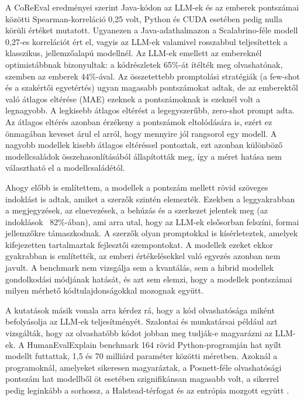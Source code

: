 \documentclass[
]{elteikthesis}[2024/04/26]
\begin{document}
A CoReEval eredményei szerint Java-kódon az LLM-ek és az emberek pontszámai
közötti Spearman-korreláció 0,25 volt, Python és CUDA esetében pedig nulla
körüli értéket mutatott. Ugyanezen a Java-adathalmazon a Scalabrino-féle modell
0,27-es korrelációt ért el, vagyis az LLM-ek valamivel rosszabbul teljesítettek
a klasszikus, jellemzőalapú modellnél. Az LLM-ek emellett az embereknél
optimistábbnak bizonyultak: a kódrészletek 65\%-át ítélték meg olvashatónak,
szemben az emberek 44\%-ával. Az összetettebb promptolási stratégiák (a few-shot
és a szakértői egyetértés) ugyan magasabb pontszámokat adtak, de az emberektől
való átlagos eltérése (MAE) ezeknek a pontszámoknak is ezeknél volt a
legnagyobb. A legkisebb átlagos eltérést a legegyszerűbb, zero-shot prompt adta.
Az átlagos eltérés azonban érzékeny a pontszámok eltolódására is, ezért ez
önmagában keveset árul el arról, hogy mennyire jól rangsorol egy modell. A
nagyobb modellek kisebb átlagos eltéréssel pontoztak, ezt azonban különböző
modellcsaládok összehasonlításából állapították meg, így a méret hatása nem
választható el a modellcsaládétól.

Ahogy előbb is említettem, a modellek a pontszám mellett rövid szöveges
indoklást is adtak, amiket a szerzők szintén elemezték. Ezekben a leggyakrabban
a megjegyzések, az elnevezések, a behúzás és a szerkezet jelentek meg (az
indoklások ~82\%-ában), ami arra utal, hogy az LLM-ek elsősorban felszíni,
formai jellemzőkre támaszkodnak. A szerzők olyan promptokkal is kísérleteztek,
amelyek kifejezetten tartalmaztak fejlesztői szempontokat. A modellek ezeket
ekkor gyakrabban is említették, az emberi értékelésekkel való egyezés azonban
nem javult. A benchmark nem vizsgálja sem a kvantálás, sem a hibrid modellek
gondolkodási módjának hatását, és azt sem elemzi, hogy a modellek pontszámai
milyen mérhető kódtulajdonságokkal mozognak együtt.

A kutatások másik vonala arra kérdez rá, hogy a kód olvashatósága miként
befolyásolja az LLM-ek teljesítményét. Szalontai és munkatársai például azt
vizsgálták, hogy az olvashatóbb kódot jobban meg tudják-e magyarázni az LLM-ek.
A HumanEvalExplain benchmark \cite{muennighoff2024octopack} 164 rövid
Python-programján hat nyílt modellt futtattak, 1,5 és 70 milliárd paraméter
közötti méretben. Azoknál a programoknál, amelyeket sikeresen magyaráztak, a
Posnett-féle olvashatósági pontszám hat modellből öt esetében szignifikánsan
magasabb volt, a sikerrel pedig leginkább a sorhossz, a Halstead-térfogat és az
entrópia mozgott együtt \cite{szalontai2025readability}.
\end{document}
